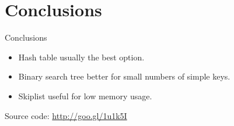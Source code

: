 \documentclass[10pt]{beamer}
\begin{document}
\section{Conclusions}

\begin{frame}{Conclusions}
    \begin{itemize}
        \item Hash table usually the best option.
        \item Binary search tree better for small numbers of simple keys.
        \item Skiplist useful for low memory usage.
    \end{itemize}

    Source code: \url{http://goo.gl/1u1k5I}
\end{frame}
\end{document}
